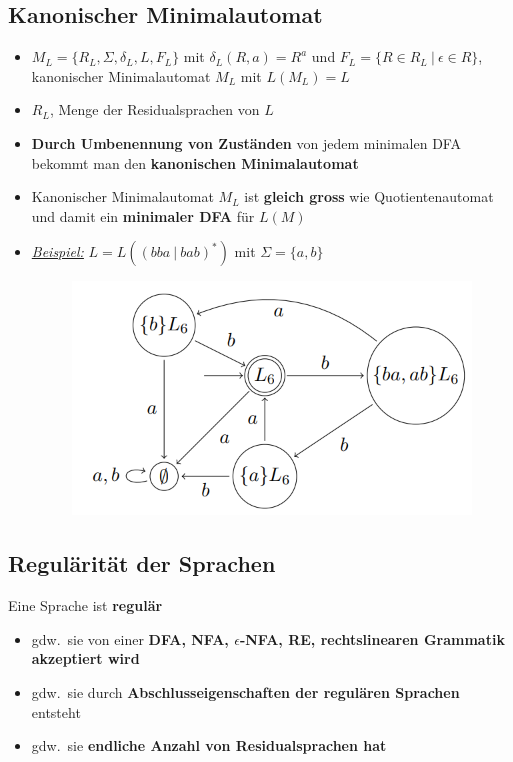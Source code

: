 \documentclass[ieeetran]{article}
\begin{document}
\subsection{Kanonischer Minimalautomat} %
\label{sub:kanonischer_minimalautomat}

\begin{itemize}
	\item $M_L = \{R_L, \Sigma, \delta_L, L, F_L\}$ mit $\delta_L(R,a) = R^a$ und $F_L = \{R \in R_L \ | \ \epsilon \in R\}$, kanonischer Minimalautomat $M_L$ mit $L(M_L) = L$
	\item $R_L$, Menge der Residualsprachen von $L$ 

\item \textbf{Durch Umbenennung von Zuständen} von jedem minimalen DFA bekommt man den \textbf{kanonischen Minimalautomat}

\item Kanonischer Minimalautomat $M_L$ ist \textbf{gleich gross} wie Quotientenautomat und damit ein \textbf{minimaler DFA} für $L(M)$

\item \textit{\underline{Beispiel:}} $L = L((bba \ | \ bab)^*)$ mit $\Sigma = \{a, b\}$
\begin{figure}[h!]
  \centering
  \includegraphics[width=0.5\linewidth]{kanonischerdfa.png}
  \label{fig:kanonischerdfa_png}
\end{figure}
\end{itemize}

\subsection{Regulärität der Sprachen} %
\label{sub:regulärität_der_sprachen}
Eine Sprache ist \textbf{regulär}

\begin{itemize}
  \item gdw.\ sie von einer \textbf{DFA, NFA, $\epsilon$-NFA, RE, rechtslinearen Grammatik akzeptiert wird}
\item gdw.\ sie durch \textbf{Abschlusseigenschaften der regulären Sprachen} entsteht

\item gdw.\ sie \textbf{endliche Anzahl von Residualsprachen hat}
\end{itemize}
\end{document}

